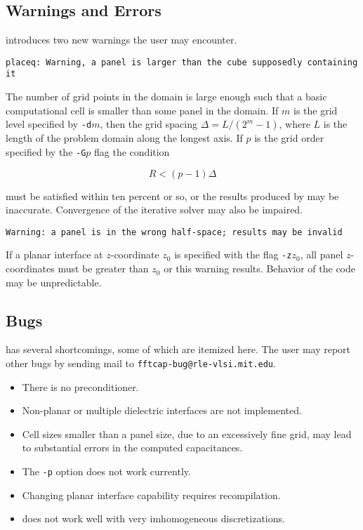 \subsection{Warnings and Errors}

\thecode introduces two new warnings the user may encounter. 

\begin{verbatim}
placeq: Warning, a panel is larger than the cube supposedly containing it
\end{verbatim}\vspace{-\topsep}

The number of grid points in the domain is large enough such that a basic
computational cell is smaller than some panel in the domain.  
If $m$ is the grid level specified by {\tt -d$m$}, then the grid spacing
$\Delta = L / (2^m-1)$, where $L$ is the length of the problem domain along
the longest axis.   If $p$ is the grid order specified by the {\tt -G$p$}
flag the condition  

\[ R < (p-1) \Delta \] 

must be satisfied within ten percent or so, or the results produced by
\thecode may be inaccurate.  Convergence of the iterative solver may also
be impaired. 

\begin{verbatim}
Warning: a panel is in the wrong half-space; results may be invalid
\end{verbatim}\vspace{-\topsep}

If a planar interface at $z$-coordinate $z_0$ is specified with the flag
{\tt -z$z_0$}, all panel $z$-coordinates must be greater than $z_0$ or this
warning results.   Behavior of the code may be unpredictable. 

\subsection{Bugs}

\thecode has several shortcomings, some of which are itemized here. The
user may report other bugs by sending mail 
to \verb~fftcap-bug@rle-vlsi.mit.edu~.

\begin{itemize}

\item There is no preconditioner. 

\item Non-planar or multiple dielectric interfaces are not implemented. 

\item Cell sizes smaller than a panel size, due to an excessively fine
  grid, may lead to substantial errors in the computed capacitances.

\item The {\tt -p} option does not work currently.  

\item Changing planar interface capability requires recompilation. 

\item \thecode does not work well with very imhomogeneous discretizations. 

\end{itemize}

